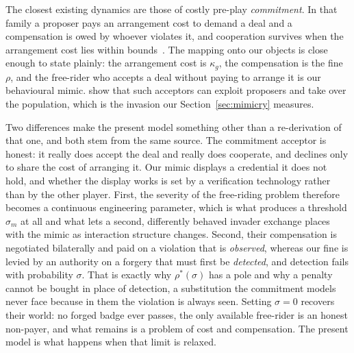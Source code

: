 \documentclass[11pt,a4paper]{article}
\theoremstyle{definition}
\begin{document}
The closest existing dynamics are those of costly pre-play \emph{commitment}.
In that family a proposer pays an arrangement cost to demand a deal and a
compensation is owed by whoever violates it, and cooperation survives when the
arrangement cost lies within
bounds~\citep{han2013agreements,han2017commitment}. The mapping onto our
objects is close enough to state plainly: the arrangement cost is
$\kappa_g$, the compensation is the fine $\rho$, and the
free-rider who accepts a deal without paying to arrange it is our behavioural
mimic. \citet{martinez2017freeriders} show that such acceptors can exploit
proposers and take over the population, which is the invasion our
Section~\ref{sec:mimicry} measures.

Two differences make the present model something other than a re-derivation of
that one, and both stem from the same source. The commitment acceptor is
honest: it really does accept the deal and really does cooperate, and declines
only to share the cost of arranging it. Our mimic displays a credential it does
not hold, and whether the display works is set by a verification technology
rather than by the other player. First, the severity of the free-riding problem
therefore becomes a continuous engineering parameter, which is what produces a
threshold $\sigma_m$ at all and what lets a second, differently behaved invader
exchange places with the mimic as interaction structure changes. Second, their
compensation is negotiated bilaterally and paid on a violation that is
\emph{observed}, whereas our fine is levied by an authority on a forgery that
must first be \emph{detected}, and detection fails with probability $\sigma$.
That is exactly why $\rho^{*}(\sigma)$ has a pole and why a penalty cannot be
bought in place of detection, a substitution the commitment models never face
because in them the violation is always seen. Setting $\sigma = 0$ recovers
their world: no forged badge ever passes, the only available free-rider is an
honest non-payer, and what remains is a problem of cost and compensation. The
present model is what happens when that limit is relaxed.
\end{document}
